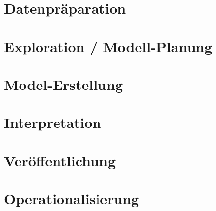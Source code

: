 \section{Datenpräparation}

\section{Exploration / Modell-Planung}

\section{Model-Erstellung}

\section{Interpretation}

\section{Veröffentlichung}



\section{Operationalisierung}




